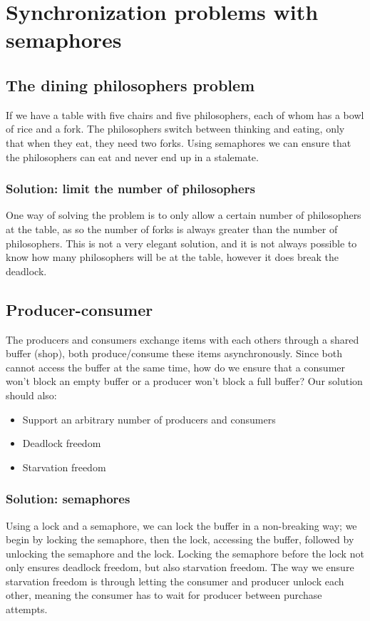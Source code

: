 \chapter{Synchronization problems with semaphores}
\section{The dining philosophers problem}
If we have a table with five chairs and five philosophers, each of whom has a bowl of rice and a fork. The philosophers switch between thinking and eating, only that when they eat, they need two forks. Using semaphores we can ensure that the philosophers can eat and never end up in a stalemate.
\subsection{Solution: limit the number of philosophers}
One way of solving the problem is to only allow a certain number of philosophers at the table, as so the number of forks is always greater than the number of philosophers. This is not a very elegant solution, and it is not always possible to know how many philosophers will be at the table, however it does break the deadlock.

\section{Producer-consumer}
The producers and consumers exchange items with each others through a shared buffer (shop), both produce/consume these items asynchronously. Since both cannot access the buffer at the same time, how do we ensure that a consumer won't block an empty buffer or a producer won't block a full buffer? Our solution should also:
\begin{itemize}
	\item Support an arbitrary number of producers and consumers
	\item Deadlock freedom
	\item Starvation freedom
\end{itemize}
\subsection{Solution: semaphores}
Using a lock and a semaphore, we can lock the buffer in a non-breaking way; we begin by locking the semaphore, then the lock, accessing the buffer, followed by unlocking the semaphore and the lock. Locking the semaphore before the lock not only ensures deadlock freedom, but also starvation freedom. The way we ensure starvation freedom is through letting the consumer and producer unlock each other, meaning the consumer has to wait for producer between purchase attempts.
